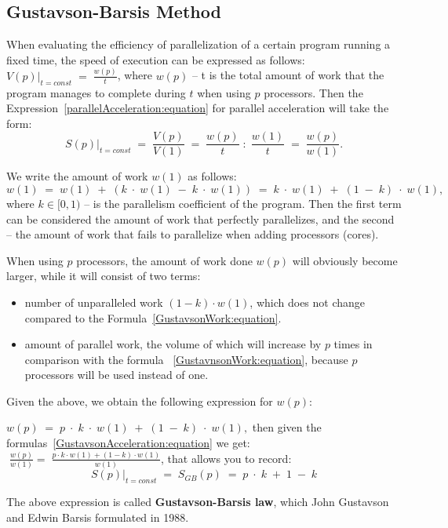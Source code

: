 { %
	\subsection{Gustavson-Barsis Method}
	\par When evaluating the efficiency of parallelization of a certain program running a fixed time, the speed of execution can be expressed as follows: $\left.V(p)\right|_{t=const}\;=\;\frac {w(p)}t$, where $w(p)$ – t is the total amount of work that the program manages to complete during $ t $ when using $p$ processors. Then the Expression~\eqref{parallelAcceleration:equation} for parallel acceleration will take the form:
	\begin{equation}
		\label{GustavsonAcceleration:equation}
		\left.S(p)\right|_{t=const}\;=\;\frac{V(p)}{V(1)}\;=\;\frac{w(p)}t\;:\;\frac{w(1)}t\;=\;\frac{w(p)}{w(1)}.
	\end{equation}
	\par We write the amount of work $w (1)$ as follows:
	\begin{equation}
		\label{GustavsonWork:equation}
		w(1)\;=\;w(1)\;+\;(k\;\cdot\;w(1)\;-\;k\;\cdot\;w(1))\;=\;k\;\cdot\;w(1)\;+\;(1\;-\;k)\;\cdot\;w(1),
	\end{equation}
	where $k\in\lbrack0,1)$ – is the parallelism coefficient of the program. Then the first term can be considered the amount of work that perfectly parallelizes, and the second – the amount of work that fails to parallelize when adding processors (cores).
	\par When using $p$ processors, the amount of work done $w(p)$ will obviously become larger, while it will consist of two terms:
	\begin{itemize}
		\item number of unparalleled work $(1-k)\cdot w(1)$, which does not change compared to the Formula~\eqref{GustavsonWork:equation}.
		\item amount of parallel work, the volume of which will increase by $p$ times in comparison with the formula ~\eqref{GustavnsonWork:equation}, because $p$ processors will be used instead of one.
	\end{itemize}
	\par Given the above, we obtain the following expression for $w(p)$:
	\par$w(p)\;=\;p\;\cdot\;k\;\cdot\;w(1)\;+\;(1\;-\;k)\;\cdot\;w(1),$ then given the formulas~\eqref{GustavsonAcceleration:equation} we get: $\;\frac{w(p)}{w(1)}=\;\frac{p\cdot k\cdot w(1)+(1-k)\cdot w(1)}{w(1)}$, that allows you to record:
	\begin{equation}
		\left.S(p)\right|_{t=const}\;=\;S_{GB}(p)\;=\;p\;\cdot\;k\;+\;1\;-\;k
	\end{equation}
	\par The above expression is called \textbf {Gustavson-Barsis law}, which John Gustavson and Edwin Barsis formulated in 1988.
	\par
}